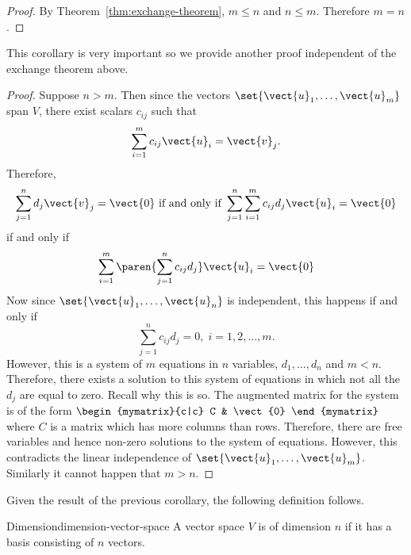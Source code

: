 \begin{proof} By Theorem~\ref{thm:exchange-theorem}, $m\leq n$ and $n\leq m$. Therefore $m=n$. 
\end{proof}

This corollary is very important so we provide another proof independent of the exchange theorem above.

\begin{proof}Suppose $n > m$. Then since the vectors $\set{\vect{u}
_{1},\ldots,\vect{u}_{m}} $ span $V$, there exist scalars $c_{ij}$
such that 
\begin{equation*}
\sum_{i=1}^{m}c_{ij}\vect{u}_{i}=\vect{v}_{j}.
\end{equation*}
Therefore, 
\begin{equation*}
\sum_{j=1}^{n}d_{j}\vect{v}_{j}=\vect{0}
\text{ if and only if }\sum_{j=1}^{n}\sum_{i=1}^{m}c_{ij}d_{j}\vect{u}_{i}=
\vect{0}
\end{equation*}
if and only if 
\begin{equation*}
\sum_{i=1}^{m}\paren{\sum_{j=1}^{n}c_{ij}d_{j}} \vect{u}_{i}=\vect{
0}
\end{equation*}
Now since $\set{\vect{u}_{1},\ldots,\vect{u}_{n}}$ is independent, this
happens if and only if 
\begin{equation*}
\sum_{j=1}^{n}c_{ij}d_{j}=0,\;i=1,2,\ldots,m.
\end{equation*}
However, this is a system of $m$ equations in $n$ variables,
$d_{1},\ldots,d_{n}$ and $m<n$. Therefore, there exists a solution to
this system of equations in which not all the $d_{j}$ are equal to
zero. Recall why this is so. The augmented matrix for the system is of
the form $\begin{mymatrix}{c|c} C & \vect{0}
\end{mymatrix} $ where $C$ is a matrix which has more columns than rows. Therefore,
there are free variables and hence non-zero solutions to the system of
equations. However, this contradicts the linear independence of $\set{
\vect{u}_{1},\ldots,\vect{u}_{m}}$. Similarly it cannot happen
that $m > n$.
\end{proof}

Given the result of the previous corollary, the following definition follows.

\begin{definition}{Dimension}{dimension-vector-space}
 A vector space $V$ is of dimension $n$ if it has a basis consisting of $n$ vectors.
\end{definition}


